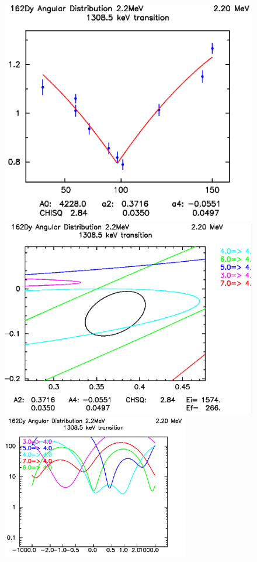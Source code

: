 \begin{figure}[ht]
\begin{center}
\includegraphics[height=0.25\textheight]{1308_AD_fit.png}
\includegraphics[height=0.25\textheight]{1308_AD_chisq_fit.png}\\
\includegraphics[width=0.73\textwidth]{1308_AD_delta_chi.png}\\

\end{center}
\end{figure}
